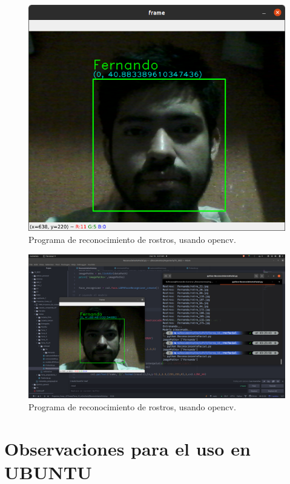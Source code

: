 \documentclass[12pt,letterpaper]{article}
\begin{document}
\begin{figure}[H]
\centering
\includegraphics[scale=0.5]{Rostro.png}
\caption{Programa de reconocimiento de rostros, usando opencv.}
\end{figure}

\begin{figure}[H]
\centering
\includegraphics[scale=0.25]{Rostro2.png}
\caption{Programa de reconocimiento de rostros, usando opencv.}
\end{figure}

\section{Observaciones para el uso en UBUNTU}
\end{document}
